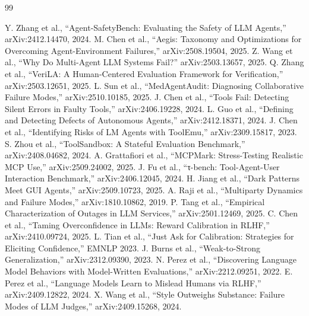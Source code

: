 \documentclass[12pt,a4paper]{report}
\begin{document}
\begin{thebibliography}{99}

 Y. Zhang et al., ``Agent-SafetyBench: Evaluating the Safety of LLM Agents,'' arXiv:2412.14470, 2024.
 M. Chen et al., ``Aegis: Taxonomy and Optimizations for Overcoming Agent-Environment Failures,'' arXiv:2508.19504, 2025.
 Z. Wang et al., ``Why Do Multi-Agent LLM Systems Fail?'' arXiv:2503.13657, 2025.
 Q. Zhang et al., ``VeriLA: A Human-Centered Evaluation Framework for Verification,'' arXiv:2503.12651, 2025.
 L. Sun et al., ``MedAgentAudit: Diagnosing Collaborative Failure Modes,'' arXiv:2510.10185, 2025.
 J. Chen et al., ``Tools Fail: Detecting Silent Errors in Faulty Tools,'' arXiv:2406.19228, 2024.
 L. Guo et al., ``Defining and Detecting Defects of Autonomous Agents,'' arXiv:2412.18371, 2024.
 J. Chen et al., ``Identifying Risks of LM Agents with ToolEmu,'' arXiv:2309.15817, 2023.
 S. Zhou et al., ``ToolSandbox: A Stateful Evaluation Benchmark,'' arXiv:2408.04682, 2024.
 A. Grattafiori et al., ``MCPMark: Stress-Testing Realistic MCP Use,'' arXiv:2509.24002, 2025.
 J. Fu et al., ``τ-bench: Tool-Agent-User Interaction Benchmark,'' arXiv:2406.12045, 2024.
 H. Jiang et al., ``Dark Patterns Meet GUI Agents,'' arXiv:2509.10723, 2025.
 A. Raji et al., ``Multiparty Dynamics and Failure Modes,'' arXiv:1810.10862, 2019.
 P. Tang et al., ``Empirical Characterization of Outages in LLM Services,'' arXiv:2501.12469, 2025.
 C. Chen et al., ``Taming Overconfidence in LLMs: Reward Calibration in RLHF,'' arXiv:2410.09724, 2025.
 L. Tian et al., ``Just Ask for Calibration: Strategies for Eliciting Confidence,'' EMNLP 2023.
 J. Burns et al., ``Weak-to-Strong Generalization,'' arXiv:2312.09390, 2023.
 N. Perez et al., ``Discovering Language Model Behaviors with Model-Written Evaluations,'' arXiv:2212.09251, 2022.
 E. Perez et al., ``Language Models Learn to Mislead Humans via RLHF,'' arXiv:2409.12822, 2024.
 X. Wang et al., ``Style Outweighs Substance: Failure Modes of LLM Judges,'' arXiv:2409.15268, 2024.

\end{thebibliography}
\end{document}
